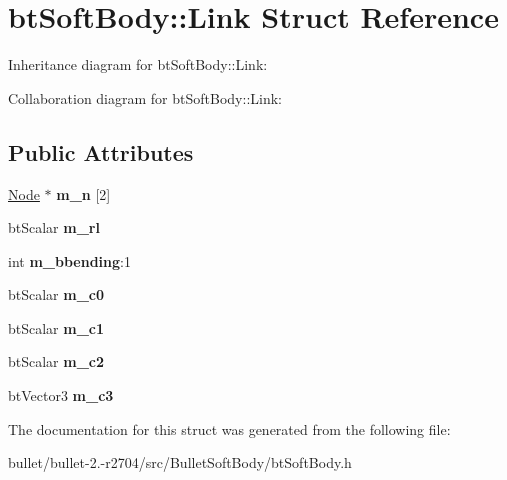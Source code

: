 \hypertarget{structbt_soft_body_1_1_link}{\section{bt\+Soft\+Body\+:\+:Link Struct Reference}
\label{structbt_soft_body_1_1_link}
}


Inheritance diagram for bt\+Soft\+Body\+:\+:Link\+:


Collaboration diagram for bt\+Soft\+Body\+:\+:Link\+:
\subsection*{Public Attributes}
\begin{DoxyCompactItemize}
\item 
\hypertarget{structbt_soft_body_1_1_link_ad45191444e0c41525c7be8dc72eb8f7f}{\hyperlink{structbt_soft_body_1_1_node}{Node} $\ast$ {\bfseries m\+\_\+n} \mbox{[}2\mbox{]}}\label{structbt_soft_body_1_1_link_ad45191444e0c41525c7be8dc72eb8f7f}

\item 
\hypertarget{structbt_soft_body_1_1_link_ae817453c9089ab7e0ddfa32b300b0d8a}{bt\+Scalar {\bfseries m\+\_\+rl}}\label{structbt_soft_body_1_1_link_ae817453c9089ab7e0ddfa32b300b0d8a}

\item 
\hypertarget{structbt_soft_body_1_1_link_a17ea04d617ec225f0213b30228ad6cb1}{int {\bfseries m\+\_\+bbending}\+:1}\label{structbt_soft_body_1_1_link_a17ea04d617ec225f0213b30228ad6cb1}

\item 
\hypertarget{structbt_soft_body_1_1_link_a42498700f2ae06261fcf41f5f1733369}{bt\+Scalar {\bfseries m\+\_\+c0}}\label{structbt_soft_body_1_1_link_a42498700f2ae06261fcf41f5f1733369}

\item 
\hypertarget{structbt_soft_body_1_1_link_abb46e72d3788091ec006b866ee2b4692}{bt\+Scalar {\bfseries m\+\_\+c1}}\label{structbt_soft_body_1_1_link_abb46e72d3788091ec006b866ee2b4692}

\item 
\hypertarget{structbt_soft_body_1_1_link_ad89b9138b78a7c5ad5f2ed99bedb96c7}{bt\+Scalar {\bfseries m\+\_\+c2}}\label{structbt_soft_body_1_1_link_ad89b9138b78a7c5ad5f2ed99bedb96c7}

\item 
\hypertarget{structbt_soft_body_1_1_link_a3d49299cc32dfbe9e864b6bd183e2d7f}{bt\+Vector3 {\bfseries m\+\_\+c3}}\label{structbt_soft_body_1_1_link_a3d49299cc32dfbe9e864b6bd183e2d7f}

\end{DoxyCompactItemize}


The documentation for this struct was generated from the following file\+:\begin{DoxyCompactItemize}
\item 
bullet/bullet-\/2.-\/r2704/src/\+Bullet\+Soft\+Body/bt\+Soft\+Body.\+h\end{DoxyCompactItemize}
